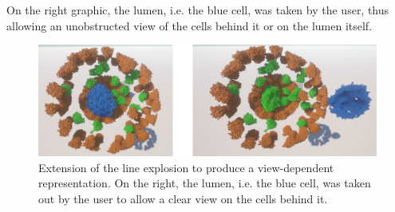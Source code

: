 On the right graphic, the lumen, i.e. the blue cell, was taken by the user, thus allowing an unobstructed view of the cells behind it or on the lumen itself.  
\begin{figure}[h]
	\centering
	\includegraphics[width=1\linewidth]{fig/Images/HeadMountedLineExplosion}
	\caption[]{Extension of the line explosion to produce a view-dependent representation. On the right, the lumen, i.e. the blue cell, was taken out by the user to allow a clear view on the cells behind it.  }
	\label{fig:HeadMountedLineExplosion}
\end{figure}

